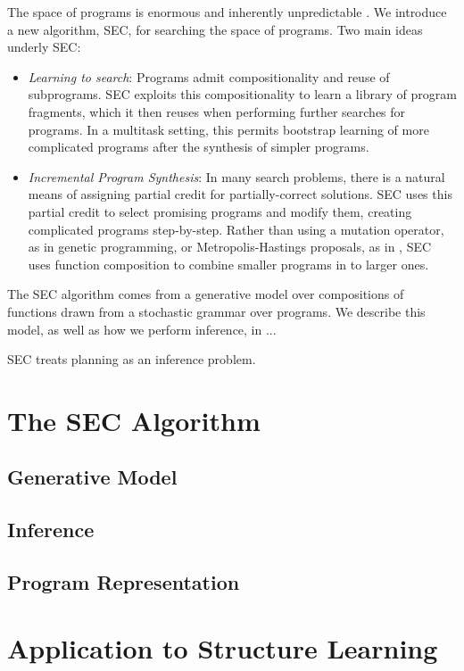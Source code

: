 \documentclass{article} %
\begin{document}
The space of programs is enormous and inherently unpredictable \cite{PACunpredictability}.
We introduce a new algorithm, SEC, for searching the space of programs.
Two main ideas underly SEC:
\begin{itemize}
\item \emph{Learning to search}: Programs admit compositionality and reuse of subprograms. SEC exploits this compositionality to learn a library of program fragments, which it then reuses when performing further searches for programs.
In a multitask setting, this permits bootstrap learning of more complicated programs after the synthesis of simpler programs.
\item \emph{Incremental Program Synthesis}: In many search problems, there is a natural means of assigning partial credit for partially-correct solutions. SEC uses this partial credit to select promising programs and modify them, creating complicated programs step-by-step.
Rather than using a mutation operator, as in genetic programming, or Metropolis-Hastings proposals, as in \cite{MHprogramInduction}, SEC uses function composition to combine smaller programs in to larger ones.
\end{itemize}

The SEC algorithm comes from a generative model over compositions of functions drawn from a stochastic grammar over programs.
We describe this model, as well as how we perform inference, in ...

SEC treats planning as an inference problem.

\section{The SEC Algorithm}
\subsection{Generative Model}
\subsection{Inference}
\subsection{Program Representation}

\section{Application to Structure Learning}
\end{document}
